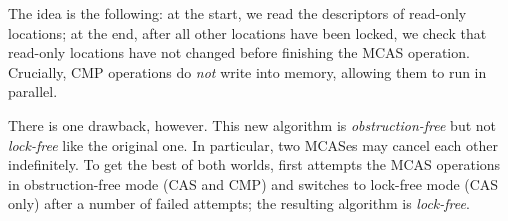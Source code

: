 The idea is the following: at the start, we read the descriptors of read-only locations; at the end, after all other locations have been locked, we check that read-only locations have not changed before finishing the MCAS operation.
Crucially, CMP operations do \emph{not} write into memory, allowing them to run in parallel.

There is one drawback, however.
This new algorithm is \emph{obstruction-free} but not \emph{lock-free} like the original one.
In particular, two MCASes may cancel each other indefinitely.
To get the best of both worlds, \Kcas first attempts the MCAS operations in obstruction-free mode (CAS and CMP) and switches to lock-free mode (CAS only) after a number of failed attempts; the resulting algorithm is \emph{lock-free}.
